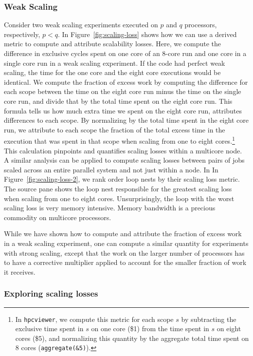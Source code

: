 \documentclass[12pt]{article}
\begin{document}
\subsubsection*{Weak Scaling}

Consider two weak scaling experiments executed on $p$ and $q$ processors,
respectively, $p<q$. In Figure~\ref{fig:scaling-loss} shows how we can
use a derived metric to compute and attribute scalability losses. Here, we
compute the difference in exclusive cycles spent on one core of an 8-core
run and one core in a single core run in a weak scaling experiment. If the
code had perfect weak scaling, the time for the one core and the eight
core executions would be identical. We compute the fraction of excess
work by computing the difference for each scope between the time on the
eight core run minus the time on the single core run, and divide that by
the total time spent on the eight core run. This formula tells us how
much extra time we spent on the eight core run, attributes differences
to each scope. By normalizing by the total time spent in the eight core
run, we attribute to each scope the fraction of the total excess time in
the execution that was spent in that scope when scaling from one to eight
cores.\footnote{In {\tt hpcviewer}, we compute this metric for each scope
$s$ by subtracting the exclusive time spent in $s$ on one core (\$1) from
the time spent in $s$ on eight cores (\$5), and normalizing this quantity
by the aggregate total time spent on 8 cores ({\tt aggregate(\&5)}).}
This calculation pinpoints and quantifies scaling losses within a
multicore node. A similar analysis can be applied to compute scaling
losses between pairs of jobs scaled across an entire parallel system and
not just within a node. In  In Figure~\ref{fig:scaling-loss-2}, we rank
order loop nests by their scaling loss metric.  The source pane shows
the loop nest responsible for the greatest scaling loss when scaling
from one to eight cores. Unsurprisingly, the loop with the worst scaling
loss is very memory intensive. Memory bandwidth is a precious commodity
on multicore processors.

While we have shown how to compute and attribute the fraction of excess
work in a weak scaling experiment, one can compute a similar quantity
for experiments with strong scaling, except that the work on the larger
number of processors has to have a corrective multiplier applied to
account for the smaller fraction of work it receives.

\subsubsection{Exploring scaling losses}
\end{document}
